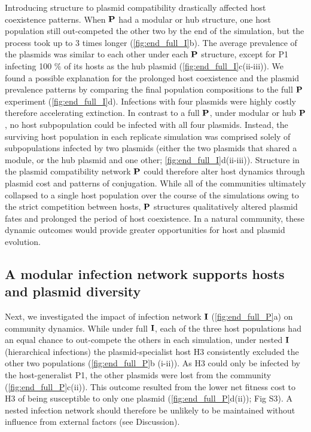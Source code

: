 \documentclass[10pt,letterpaper]{article}
\begin{document}
Introducing structure to plasmid compatibility drastically affected host coexistence patterns. When $\vb{P}$ had a modular or hub structure, one host population still out-competed the other two by the end of the simulation, but the process took up to $3$ times longer (\cref{fig:end_full_I}b). The average prevalence of the plasmids was similar to each other under each $\vb{P}$ structure, except for P1 infecting 100 $\%$ of its hosts as the hub plasmid (\cref{fig:end_full_I}c(ii-iii)). We found a possible explanation for the prolonged host coexistence and the plasmid prevalence patterns by comparing the final population compositions to the full $\vb{P}$ experiment (\cref{fig:end_full_I}d). Infections with four plasmids were highly costly therefore accelerating extinction. In contrast to a full $\vb{P}$, under modular or hub $\vb{P}$, no host subpopulation could be infected with all four plasmids. Instead, the surviving host population in each replicate simulation was comprised solely of subpopulations infected by two plasmids (either the two plasmids that shared a module, or the hub plasmid and one other; \cref{fig:end_full_I}d(ii-iii)). Structure in the plasmid compatibility network $\vb{P}$ could therefore alter host dynamics through plasmid cost and patterns of conjugation. While all of the communities ultimately collapsed to a single host population over the course of the simulations owing to the strict competition between hosts, $\vb{P}$ structures qualitatively altered plasmid fates and prolonged the period of host coexistence. In a natural community, these dynamic outcomes would provide greater opportunities for host and plasmid evolution.

\subsection*{A modular infection network supports hosts and plasmid diversity}
Next, we investigated the impact of infection network $\vb{I}$ (\cref{fig:end_full_P}a) on community dynamics. While under full $\vb{I}$, each of the three host populations had an equal chance to out-compete the others in each simulation, under nested $\vb{I}$ (hierarchical infections) the plasmid-specialist host H3 consistently excluded the other two populations (\cref{fig:end_full_P}b (i-ii)). As H3 could only be infected by the host-generalist P1, the other plasmids were lost from the community (\cref{fig:end_full_P}c(ii)). This outcome resulted from the lower net fitness cost to H3 of being susceptible to only one plasmid (\cref{fig:end_full_P}d(ii)); Fig S3). A nested infection network should therefore be unlikely to be maintained without influence from external factors (see Discussion).
\end{document}
